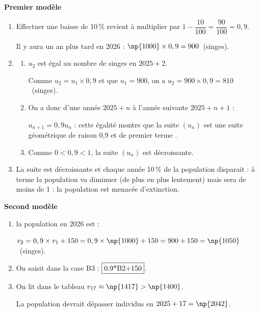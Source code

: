 \medskip

\textbf{Premier modèle}

\medskip

\begin{enumerate}
\item Effectuer une baisse de 10\,\% revient à multiplier par $1 - \dfrac{10}{100} = \dfrac{90}{100} = 0,9$.

Il y aura un an plus tard en 2026 : $\np{1000} \times 0,9 = 900$~(singes).
\item
	\begin{enumerate}
		\item $u_2$ est égal au nombre de singes en $2025 + 2$.

Comme $u_2 = u_1 \times 0,9$ et que $u_1 = 900$, on a $u_2 = 900 \times 0,9 = 810$~(singes).
		\item On a donc d'une année $2025 + n$ à l'année suivante $2025 + n + 1$ :

$u_{n+1} = 0,9 u_n$ : cette égalité montre que la suite $(u_n)$ est une suite géométrique de raison 0,9 et de premier terme .
		\item Comme $0 < 0,9 < 1$, la suite $(u_n)$ est décroissante.
	\end{enumerate}
\item La suite est décroissante et chaque année 10\,\% de la population disparait : à terme la population va diminuer (de plus en plus lentement) mais sera de moins de 1 : la population est menacée d'extinction. 
\end{enumerate}

\medskip

\textbf{Second modèle}

\medskip

\begin{enumerate}
\item la population en 2026 est :

$v_2 = 0,9 \times v_1 + 150 = 0,9 \times \np{1000} + 150 = 900 + 150 = \np{1050}$~(singes).
\item On saisit dans la case B3 : $\fbox{0.9*B2+150}$.
\item On lit dans le tableau $v_{17} \approx \np{1417} > \np{1400}$.

La population devrait dépasser  individus en $2025 + 17 = \np{2042}$.
\end{enumerate}

\bigskip
